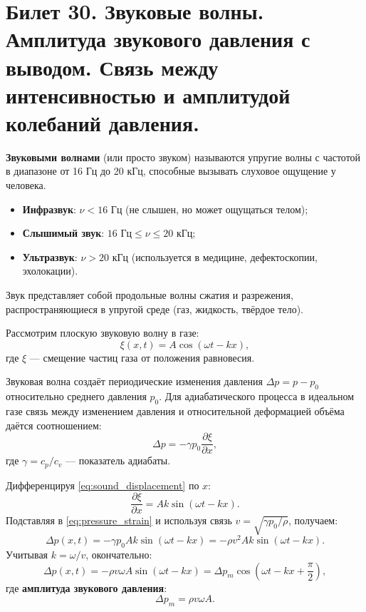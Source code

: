 \section{Билет 30. Звуковые волны. Амплитуда звукового давления с выводом. Связь между интенсивностью и амплитудой колебаний давления.}

\begin{definition}
\textbf{Звуковыми волнами} (или просто звуком) называются упругие волны с частотой в диапазоне от 16 Гц до 20 кГц, способные вызывать слуховое ощущение у человека.
\begin{itemize}
    \item \textbf{Инфразвук}: $\nu < 16$ Гц (не слышен, но может ощущаться телом);
    \item \textbf{Слышимый звук}: $16 \text{ Гц} \le \nu \le 20 \text{ кГц}$;
    \item \textbf{Ультразвук}: $\nu > 20$ кГц (используется в медицине, дефектоскопии, эхолокации).
\end{itemize}
Звук представляет собой продольные волны сжатия и разрежения, распространяющиеся в упругой среде (газ, жидкость, твёрдое тело).
\end{definition}

\begin{theorem}
Рассмотрим плоскую звуковую волну в газе:
\begin{equation}
    \xi(x,t) = A \cos(\omega t - kx), \label{eq:sound_displacement}
\end{equation}
где $\xi$ --- смещение частиц газа от положения равновесия.

Звуковая волна создаёт периодические изменения давления $\Delta p = p - p_0$ относительно среднего давления $p_0$. Для адиабатического процесса в идеальном газе связь между изменением давления и относительной деформацией объёма даётся соотношением:
\begin{equation}
    \Delta p = -\gamma p_0 \frac{\partial \xi}{\partial x}, \label{eq:pressure_strain}
\end{equation}
где $\gamma = c_p/c_v$ --- показатель адиабаты.

Дифференцируя \eqref{eq:sound_displacement} по $x$:
\begin{equation}
    \frac{\partial \xi}{\partial x} = Ak \sin(\omega t - kx).
\end{equation}
Подставляя в \eqref{eq:pressure_strain} и используя связь $v = \sqrt{\gamma p_0 / \rho}$, получаем:
\begin{equation}
    \Delta p(x,t) = -\gamma p_0 A k \sin(\omega t - kx) = -\rho v^2 A k \sin(\omega t - kx).
\end{equation}
Учитывая $k = \omega/v$, окончательно:
\begin{equation}
    \Delta p(x,t) = -\rho v \omega A \sin(\omega t - kx) = \Delta p_m \cos\left(\omega t - kx + \frac{\pi}{2}\right), \label{eq:pressure_wave}
\end{equation}
где \textbf{амплитуда звукового давления}:
\begin{equation}
    \Delta p_m = \rho v \omega A. \label{eq:pressure_amplitude}
\end{equation}
\end{theorem}


